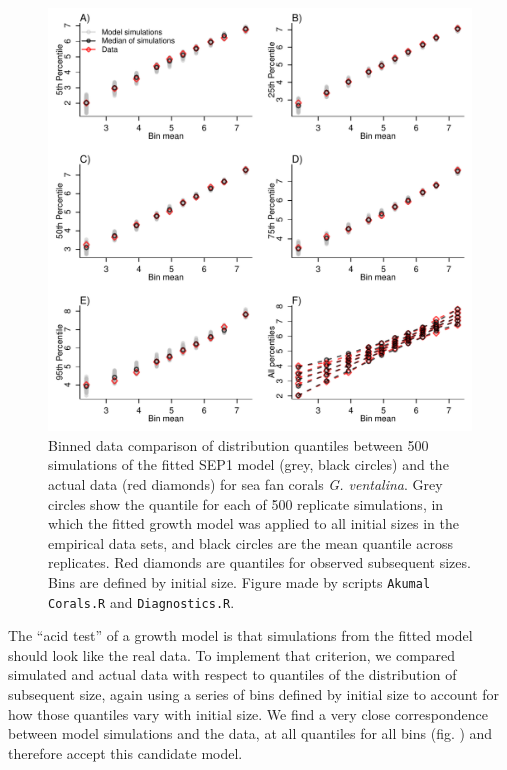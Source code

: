\documentclass[11pt]{article}
\begin{document}
{\begin{figure}[tbp]
\centering
\includegraphics[width=.95\textwidth]{figures/CoralQuantileComparePlot.pdf}
\caption{Binned data comparison of distribution quantiles between 500 simulations of the fitted SEP1 model (grey, black circles) and the 
actual data (red diamonds) for sea fan corals \emph{G. ventalina}. Grey circles show the quantile for each of 500 replicate simulations,
in which the fitted growth model was applied to all initial sizes in the empirical data sets, and black circles are the mean
quantile across replicates. Red diamonds are quantiles for observed subsequent sizes. Bins are defined by initial size. Figure
made by scripts \texttt{Akumal Corals.R} and \texttt{Diagnostics.R}.}
\label{fig:CoralQuantileCompare}
\end{figure} 

The ``acid test'' of a growth model is that simulations from the fitted model should look like the real data. 
To implement that criterion, we compared simulated and actual data with respect to quantiles of the distribution
of subsequent size, again using a series of bins defined by initial size to account for how those quantiles vary
with initial size. We find a very close correspondence between model simulations and the data, at all quantiles for all bins
(fig. ) and therefore accept this candidate model. 
 
}
\end{document}
